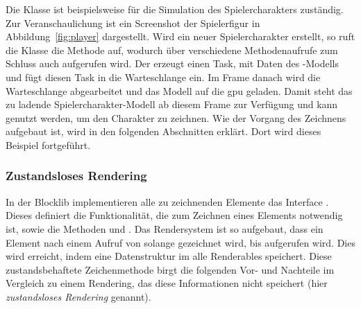 Die Klasse  ist beispielsweise für die Simulation des Spielercharakters zuständig. Zur Veranschaulichung ist ein Screenshot der Spielerfigur in Abbildung~\vref{fig:player} dargestellt. Wird ein neuer Spielercharakter erstellt, so ruft die Klasse  die Methode  auf, wodurch über verschiedene Methodenaufrufe zum Schluss auch  aufgerufen wird. Der  erzeugt einen Task, mit Daten des -Modells und fügt diesen Task in die Warteschlange ein. Im Frame danach wird die Warteschlange abgearbeitet und das Modell auf die \ac{gpu} geladen. Damit steht das zu ladende Spielercharakter-Modell ab diesem Frame zur Verfügung und kann genutzt werden, um den Charakter zu zeichnen. Wie der Vorgang des Zeichnens aufgebaut ist, wird in den folgenden Abschnitten erklärt. Dort wird dieses Beispiel fortgeführt.

\subsubsection{Zustandsloses Rendering}\label{sec:statelessRendering}
In der Blocklib implementieren alle zu zeichnenden Elemente das Interface . Dieses definiert die Funktionalität, die zum Zeichnen eines Elements notwendig ist, sowie die Methoden  und . Das Rendersystem ist so aufgebaut, dass ein Element nach einem Aufruf von  solange gezeichnet wird, bis  aufgerufen wird. Dies wird erreicht, indem eine Datenstruktur im  alle Renderables speichert. Diese zustandsbehaftete Zeichenmethode birgt die folgenden Vor- und Nachteile im Vergleich zu einem Rendering, das diese Informationen nicht speichert (hier \emph{zustandsloses Rendering} genannt).

